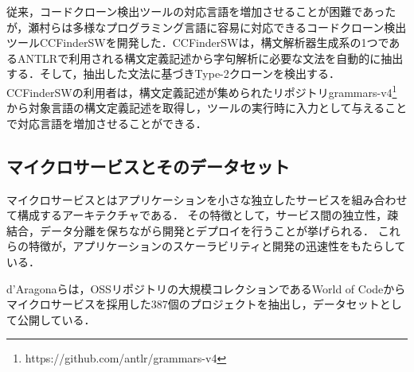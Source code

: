 \documentclass[T,J]{fose}
\begin{document}

従来，コードクローン検出ツールの対応言語を増加させることが困難であったが，瀬村らは多様なプログラミング言語に容易に対応できるコードクローン検出ツールCCFinderSWを開発した\cite{CCFinderSW}．CCFinderSWは，構文解析器生成系の1つであるANTLRで利用される構文定義記述から字句解析に必要な文法を自動的に抽出する．そして，抽出した文法に基づきType-2クローンを検出する．
CCFinderSWの利用者は，構文定義記述が集められたリポジトリgrammars-v4\footnote{https://github.com/antlr/grammars-v4}から対象言語の構文定義記述を取得し，ツールの実行時に入力として与えることで対応言語を増加させることができる．


\subsection{マイクロサービスとそのデータセット} \label{subsec:dataset}
マイクロサービスとはアプリケーションを小さな独立したサービスを組み合わせて構成するアーキテクチャである\cite{Honda2023,mo2021existence,zhao2022}．
その特徴として，サービス間の独立性，疎結合，データ分離を保ちながら開発とデプロイを行うことが挙げられる\cite{mo2021existence,zhao2022}．
これらの特徴が，アプリケーションのスケーラビリティと開発の迅速性をもたらしている．


d'Aragonaらは，OSSリポジトリの大規模コレクションであるWorld of Code\cite{WoC}からマイクロサービスを採用した387個のプロジェクトを抽出し，データセットとして公開している\cite{amoroso2024dataset}．
\end{document}
